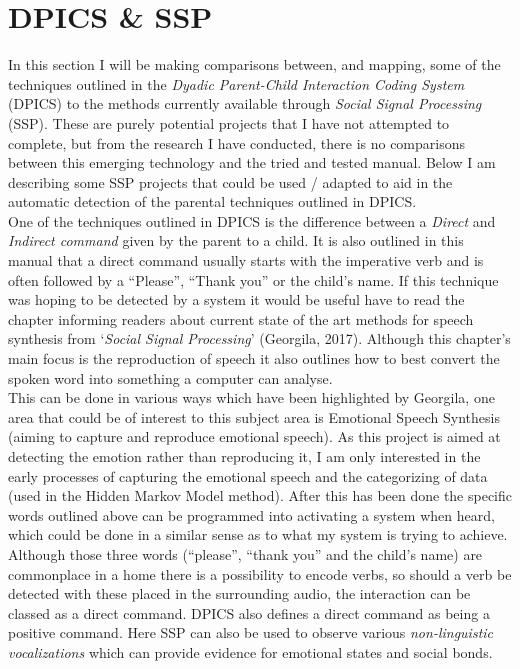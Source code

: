 \documentclass[a4paper,11pt]{report}
\begin{document}
\chapter{DPICS \& SSP}
In this section I will be making comparisons between, and mapping, some of the techniques outlined in the \textit{Dyadic Parent-Child Interaction Coding System} (DPICS) to the methods currently available through \textit{Social Signal Processing} (SSP). These are purely potential projects that I have not attempted to complete, but from the research I have conducted, there is no comparisons between this emerging technology and the tried and tested manual. Below I am describing some SSP projects that could be used / adapted to aid in the automatic detection of the parental techniques outlined in DPICS.\\

One of the techniques outlined in DPICS is the difference between a \textit{Direct} and \textit{Indirect command} given by the parent to a child. It is also outlined in this manual that a direct command usually starts with the imperative verb and is often followed by a “Please”, “Thank you” or the child’s name. If this technique was hoping to be detected by a system it would be useful have to read the chapter informing readers about current state of the art methods for speech synthesis from ‘\textit{Social Signal Processing}’ (Georgila, 2017). Although this chapter’s main focus is the reproduction of speech it also outlines how to best convert the spoken word into something a computer can analyse. \\

This can be done in various ways which have been highlighted by Georgila, one area that could be of interest to this subject area is Emotional Speech Synthesis (aiming to capture and reproduce emotional speech). As this project is aimed at detecting the emotion rather than reproducing it, I am only interested in the early processes of capturing the emotional speech and the categorizing of data (used in the Hidden Markov Model method). After this has been done the specific words outlined above can be programmed into activating a system when heard, which could be done in a similar sense as to what my system is trying to achieve. Although those three words (“please”, “thank you” and the child’s name) are commonplace in a home there is a possibility to encode verbs, so should a verb be detected with these placed in the surrounding audio, the interaction can be classed as a direct command. DPICS also defines a direct command as being a positive command. Here SSP can also be used to observe various \textit{non-linguistic vocalizations} which can provide evidence for emotional states and social bonds.\\
\end{document}
